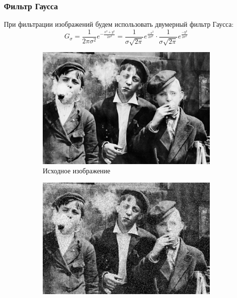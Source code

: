 \subsubsection{Фильтр Гаусса}
При фильтрации изображений будем использовать двумерный фильтр Гаусса:
\begin{equation}
   G_\sigma = \frac{1}{2\pi\sigma^2} e^{-\frac{x^2+y^2}{2\sigma^2}} = \frac{1}{\sigma\sqrt{2\pi}} e^{\frac{-x^2}{2\sigma^2}} \cdot \frac{1}{\sigma\sqrt{2\pi}} e^{\frac{-y^2}{2\sigma^2}}
\end{equation}

\begin{figure}[ht!] 
    \centering
    \begin{subfigure}[b]{0.5\linewidth}
        \centering
        \includegraphics[width=0.95\linewidth]{../lewis-hine-taschen-main-3.jpg} 
        \caption{Исходное изображение} 
        \label{gaussian_3:a} 
        \vspace{4ex}
    \end{subfigure}%
    \begin{subfigure}[b]{0.5\linewidth}
      \centering
      \includegraphics[width=0.95\linewidth]{../Gaussian_Blur/Gaussian_Blur_Impulse_noise_(3,3).jpg} 

\end{subfigure}
\end{figure}
